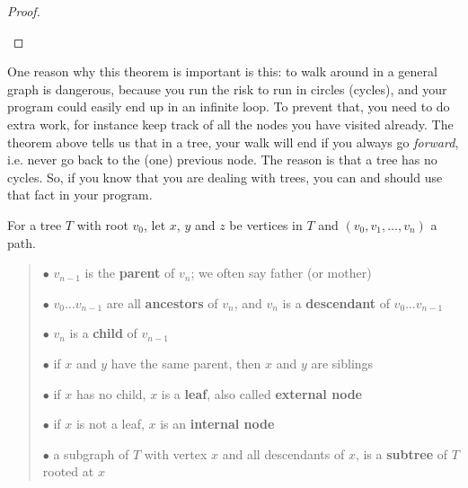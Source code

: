 \begin{proof}
\begin{itemize}
\end{itemize}
\end{proof}

One reason why this theorem is important is this: to walk around in a
general graph is dangerous, because you run the risk to run in circles
(cycles), and your program could easily end up in an infinite loop.
To prevent that, you need to do extra work, for instance keep track of
all the nodes you have visited already. The theorem above tells us
that in a tree, your walk will end if you always go {\em forward},
i.e. never go back to the (one) previous node. The reason is that a
tree has no cycles. So, if you know that you are dealing with trees,
you can and should use that fact in your program.


 \begin{definition}
\textup{For a tree $T$ with root $v_{0}$, let $x$, $y$ and $z$ be
vertices in $T$ and $(v_{0}, v_{1}, \ldots , v_{n})$ a path.
} {\rm
\begin{verse}
\hspace*{1ex}$\bullet$
$v_{n-1}$ is the \textbf{parent} of $v_{n}$; we often say father (or mother)

\hspace*{1ex}$\bullet$
$v_{0}\ldots v_{n-1}$ are all
\textbf{ancestors} of $v_{n}$, and $v_{n}$ is a \textbf{descendant} of
$v_{0}\ldots v_{n-1}$

\hspace*{1ex}$\bullet$
$v_{n}$ is a \textbf{child} of $v_{n-1}$

\hspace*{1ex}$\bullet$
if $x$ and $y$ have the same parent, then $x$ and $y$ are siblings

\hspace*{1ex}$\bullet$
if $x$ has no child, $x$ is a \textbf{leaf}, also called {\bf external node}

\hspace*{1ex}$\bullet$
if $x$ is not a leaf, $x$ is an \textbf{internal node}

\hspace*{1ex}$\bullet$
a subgraph of $T$ with vertex $x$ and all descendants of $x$, is a
{\bf subtree} of $T$ rooted at $x$\footnotemark
\end{verse}}
\end{definition}

